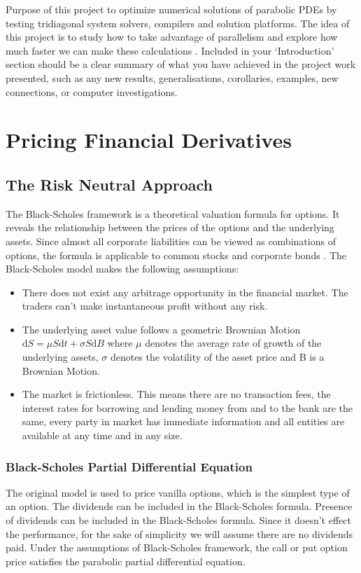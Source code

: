 \documentclass[12pt, oneside]{book}
\theoremstyle{plain}
\theoremstyle{definition}
\begin{document}
Purpose of this project to optimize numerical solutions of parabolic PDEs by testing tridiagonal system solvers, compilers and solution platforms. The idea of this project is to study how to take advantage of parallelism and explore how much faster we can make these calculations
.
Included in your ‘Introduction’ section should be a clear summary of  what  you  have  achieved  in  the  project  work  presented,  such  as  any  new  results, generalisations, corollaries, examples, new connections, or computer investigations. 

\chapter{Pricing Financial Derivatives}\label{Pricing Financial Derivatives}
\section{The Risk Neutral Approach}
The Black-Scholes framework is a theoretical valuation formula for options. It reveals the relationship between the prices of the options and the underlying assets. Since almost all corporate liabilities can be viewed as combinations of options, the formula is applicable to common stocks and corporate bonds \cite{BS}. The Black-Scholes model makes the following assumptions:
\begin{itemize}
\item There does not exist any arbitrage opportunity in the financial market.  The traders can’t make instantaneous profit without any risk.
\item The underlying asset value follows a geometric Brownian Motion $\mathrm{d}S = \mu S \mathrm{d}t + \sigma S \mathrm{d}B $ where $\mu$ denotes the average rate of growth of the underlying assets, $\sigma$ denotes the volatility of the asset price and B is a Brownian Motion.
\item The market is frictionless.  This means there are no transaction fees, the interest rates for borrowing and lending money from and to the bank are the same, every party  in  market  has  immediate  information  and  all  entities  are  available  at  any time and in any size.
\end{itemize}

\subsection{Black-Scholes Partial Differential Equation}
The original model is used to price vanilla options, which is the simplest type of an option. The dividends can be included in the Black-Scholes formula. Presence of dividends can be included in the Black-Scholes formula. Since it doesn't effect the performance, for the sake of simplicity we will assume there are no dividends paid. Under the assumptions of Black-Scholes framework, the call or put option price satisfies the parabolic partial differential equation.
\end{document}
